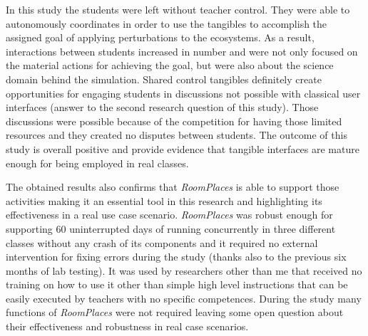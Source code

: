 In this study the students were left without teacher control. They were able to autonomously coordinates in order to use the tangibles to accomplish the assigned goal of applying perturbations to the ecosystems. As a result, interactions between students increased in number and were not only focused on the material actions for achieving the goal, but were also about the science domain behind the simulation. Shared control tangibles definitely create opportunities for engaging students in discussions not possible with classical user interfaces (answer to the second research question of this study). Those discussions were possible because of the competition for having those limited resources and they created no disputes between students. The outcome of this study is overall positive and provide evidence that tangible interfaces are mature enough for being employed in real classes. 

The obtained results also confirms that \textit{RoomPlaces} is able to support those activities making it an essential tool in this research and highlighting its effectiveness in a real use case scenario. \textit{RoomPlaces} was robust enough for supporting 60 uninterrupted days of running concurrently in three different classes without any crash of its components and it required no external intervention for fixing errors during the study (thanks also to the previous six months of lab testing). It was used by researchers other than me that received no training on how to use it other than simple high level instructions that can be easily executed by teachers with no specific competences. During the study many functions of \textit{RoomPlaces} were not required leaving some open question about their effectiveness and robustness in real case scenarios.
